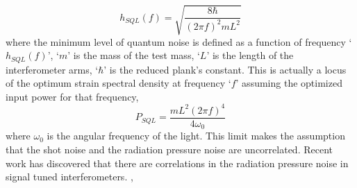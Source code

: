 \begin{equation}
    h_{SQL}(f) = \sqrt{\frac{8\hbar}{(2\pi f)^2 mL^2}} 
\end{equation}
where the minimum level of quantum noise is defined as a function of frequency `$h_{SQL}(f)$', `$m$' is  the mass of the test mass, `$L$' is the length of the interferometer arms, `$\hbar$' is the reduced plank's constant. This is actually a locus of the optimum strain spectral density at frequency `$f$' assuming the optimized input power for that frequency,
\begin{equation}
    P_{SQL} = \frac{mL^2(2\pi f)^4}{4\omega_0}
\end{equation}
where $\omega_0$ is the angular frequency of the light. This limit makes the assumption that the shot noise and the radiation pressure noise are uncorrelated. Recent work has discovered that there are correlations in the radiation pressure noise in signal tuned interferometers. \cite{buonanno18optical},\cite{buonanno2001quantum}

\pagebreak















































































\pagebreak